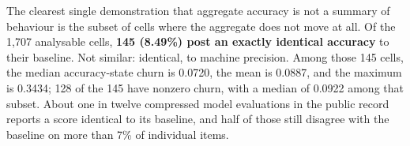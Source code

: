 The clearest single demonstration that aggregate accuracy is not a summary of
behaviour is the subset of cells where the aggregate does not move at all. Of
the 1{,}707 analysable cells, \textbf{145 (8.49\%) post an exactly identical
accuracy} to their baseline. Not similar: identical, to machine precision.
Among those 145 cells, the median accuracy-state churn is 0.0720, the
mean is 0.0887, and the maximum is 0.3434; 128 of the 145 have nonzero
churn, with a median of 0.0922 among that subset. About one in twelve compressed
model evaluations in the public record reports a score identical to its
baseline, and half of those still disagree with the baseline on more than 7\% of
individual items.

